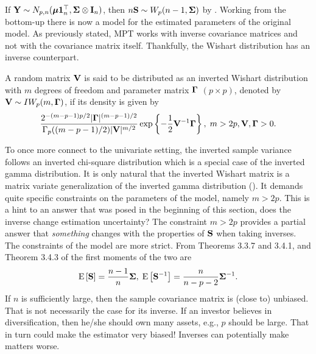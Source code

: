 \documentclass[12pt, oneside]{book}\usepackage{knitr}
\begin{document}
If $\mathbf{Y} \sim N_{p,n}(\mbox{\boldmath$\mu$} \mathbf{1}_n^\top, \mathbf{\Sigma} \otimes \mathbf{I}_n)$, then $n\mathbf{S} \sim W_p(n-1, \mathbf{\Sigma})$ by \citet[Theorem 3.3.6 in]{GuptaNagar2000}.
Working from the bottom-up there is now a model for the estimated parameters of the original model.
As previously stated, MPT works with inverse covariance matrices and not with the covariance matrix itself. 
Thankfully, the Wishart distribution has an inverse counterpart.
\begin{definition}\label{def:inverse_wishart}
	A random matrix $\mathbf{V}$ is said to be distributed as an inverted Wishart distribution with $m$ degrees of freedom and parameter matrix $\boldsymbol{\Gamma}$ $(p \times p)$, denoted by $\mathbf{V} \sim IW_p(m, \boldsymbol{\Gamma})$, if its density is given by
	\begin{equation}\label{eqn:inverse_wishart}
	\frac{2^{-(m-p-1)p/2} |\boldsymbol{\Gamma}|^{(m-p-1)/2} }{\Gamma_p ((m-p-1)/2) |\mathbf{V}|^{m/2}} \exp\left\{ -\frac{1}{2} \mathbf{V}^{-1} \boldsymbol{\Gamma} \right\}, \; m > 2p, \mathbf{V}, \boldsymbol{\Gamma} > 0.
	\end{equation}
\end{definition}
To once more connect to the univariate setting, the inverted sample variance follows an inverted chi-square distribution which is a special case of the inverted gamma distribution.
It is only natural that the inverted Wishart matrix is a matrix variate generalization of the inverted gamma distribution (\citet[page 111]{GuptaNagar2000}). 
It demands quite specific constraints on the parameters of the model, namely $m > 2p$.
This is a hint to an answer that was posed in the beginning of this section, does the inverse change estimation uncertainty? 
The constraint $m>2p$ provides a partial answer that \textit{something} changes with the properties of $\mathbf{S}$ when taking inverses.
The constraints of the model are more strict.
From Theorems 3.3.7 and 3.4.1, and Theorem 3.4.3 of \citet{GuptaNagar2000} the first moments of the two are
$$
\operatorname{E}\left[\mathbf{S}\right] = \frac{n-1}{n} \mathbf{\Sigma}, \; 
\operatorname{E}\left[\mathbf{S}^{-1}\right] = \frac{n}{n-p-2}\mathbf{\Sigma}^{-1}.
$$
If $n$ is sufficiently large, then the sample covariance matrix is (close to) unbiased.
That is not necessarily the case for its inverse.
If an investor believes in diversification, then he/she should own many assets, e.g., $p$ should be large.
That in turn could make the estimator very biased!
Inverses can potentially make matters worse.
\end{document}
